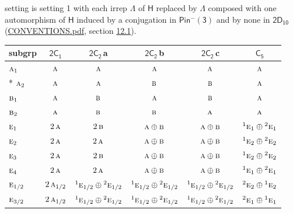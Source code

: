\documentclass[10pt,a4paper]{article}
\numberwithin{equation}{section}
\newcommand{\grp}[1]{\mathsf{#1}}
\newcommand{\irr}[1]{\text{\normalfont\scshape #1}}
\newcommand{\conjpair}[1]{{}^{#1}}
\newcommand{\clsletter}[1]{\,{\scriptsize\color{black!55}#1}}
\begin{document}
setting is setting 1 with each irrep $\Lambda$ of $\grp{H}$ replaced by $\Lambda$ composed with one automorphism of $\grp{H}$ induced by a conjugation in \href{Pinminus3.pdf}{$\grp{Pin^{-}(3)}$} and by none in $\grp{2D_{10}}$ (\href{../../CONVENTIONS.pdf}{CONVENTIONS.pdf}, section \href{../../../rotation/CONVENTIONS.pdf\#conv.12.1}{12.1}).
{\small\begin{longtable}{@{}lccccc@{}}\toprule
subgrp & \href{2C1.pdf}{$\grp{2C_{1}}$} & \href{2C2.pdf}{$\grp{2C_{2}}$}\clsletter{a} & \href{2C2.pdf}{$\grp{2C_{2}}$}\clsletter{b} & \href{2C2.pdf}{$\grp{2C_{2}}$}\clsletter{c} & \href{C5.pdf}{$\grp{C_{5}}$}\\\midrule\endhead
\bottomrule\endfoot\endlastfoot
$\irr{a}_{1}$ & $\irr{a}$ & $\irr{a}$ & $\irr{a}$ & $\irr{a}$ & $\irr{a}$\\*
$\irr{a}_{2}$ & $\irr{a}$ & $\irr{a}$ & $\irr{b}$ & $\irr{b}$ & $\irr{a}$\\
$\irr{b}_{1}$ & $\irr{a}$ & $\irr{b}$ & $\irr{a}$ & $\irr{b}$ & $\irr{a}$\\
$\irr{b}_{2}$ & $\irr{a}$ & $\irr{b}$ & $\irr{b}$ & $\irr{a}$ & $\irr{a}$\\
$\irr{e}_{1}$ & $2\,\irr{a}$ & $2\,\irr{b}$ & $\irr{a}\oplus \irr{b}$ & $\irr{a}\oplus \irr{b}$ & $\conjpair{1}\irr{e}_{1}\oplus \conjpair{2}\irr{e}_{1}$\\
$\irr{e}_{2}$ & $2\,\irr{a}$ & $2\,\irr{a}$ & $\irr{a}\oplus \irr{b}$ & $\irr{a}\oplus \irr{b}$ & $\conjpair{1}\irr{e}_{2}\oplus \conjpair{2}\irr{e}_{2}$\\
$\irr{e}_{3}$ & $2\,\irr{a}$ & $2\,\irr{b}$ & $\irr{a}\oplus \irr{b}$ & $\irr{a}\oplus \irr{b}$ & $\conjpair{1}\irr{e}_{2}\oplus \conjpair{2}\irr{e}_{2}$\\
$\irr{e}_{4}$ & $2\,\irr{a}$ & $2\,\irr{a}$ & $\irr{a}\oplus \irr{b}$ & $\irr{a}\oplus \irr{b}$ & $\conjpair{1}\irr{e}_{1}\oplus \conjpair{2}\irr{e}_{1}$\\
$\irr{e}_{1/2}$ & $2\,\irr{a}_{1/2}$ & $\conjpair{1}\irr{e}_{1/2}\oplus \conjpair{2}\irr{e}_{1/2}$ & $\conjpair{1}\irr{e}_{1/2}\oplus \conjpair{2}\irr{e}_{1/2}$ & $\conjpair{1}\irr{e}_{1/2}\oplus \conjpair{2}\irr{e}_{1/2}$ & $\conjpair{2}\irr{e}_{2}\oplus \conjpair{1}\irr{e}_{2}$\\
$\irr{e}_{3/2}$ & $2\,\irr{a}_{1/2}$ & $\conjpair{1}\irr{e}_{1/2}\oplus \conjpair{2}\irr{e}_{1/2}$ & $\conjpair{1}\irr{e}_{1/2}\oplus \conjpair{2}\irr{e}_{1/2}$ & $\conjpair{1}\irr{e}_{1/2}\oplus \conjpair{2}\irr{e}_{1/2}$ & $\conjpair{2}\irr{e}_{1}\oplus \conjpair{1}\irr{e}_{1}$\\

\end{longtable}}
\end{document}
